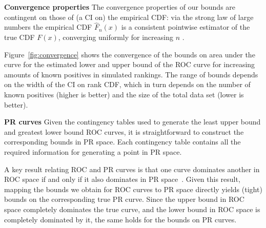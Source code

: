 {\bf Convergence properties} \label{convergence}
The convergence properties of our bounds are contingent on those of (a CI on) the empirical CDF:
via the strong law of large numbers the empirical CDF $\hat{F}_n(x)$ is a consistent pointwise estimator of the true CDF $F(x)$, converging uniformly for increasing $n$ \cite{van2000asymptotic}. %

Figure~\ref{fig:convergence} shows the convergence of the bounds on area under the curve for the estimated lower and upper bound of the ROC curve for increasing amounts of known positives in simulated rankings. The range of bounds depends on the width of the CI on rank CDF, which in turn depends on the number of known positives (higher is better) and the size of the total data set (lower is better).



{\bf PR curves} Given the contingency tables used to generate the least upper bound and greatest lower bound ROC curves, it is straightforward to construct the corresponding bounds in PR space. Each contingency table contains all the required information for generating a point in PR space. 

 A key result relating ROC and PR curves is that one curve dominates another in ROC space if and only if it also dominates in PR space~\citep{Davis:2006:RPR:1143844.1143874}. Given this result, mapping the bounds we obtain for ROC curves to PR space directly yields (tight) bounds on the corresponding true PR curve. Since the upper bound in ROC space completely dominates the true curve, and the lower bound in ROC space is completely dominated by it, the same holds for the bounds on PR curves.



